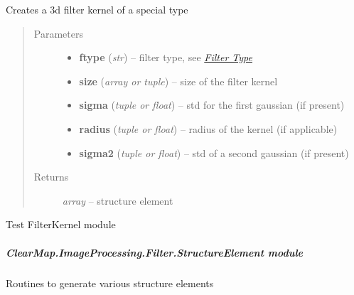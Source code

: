 \documentclass[letterpaper,10pt,english]{sphinxmanual}
\begin{document}
\begin{fulllineitems}
\label{api/ClearMap.ImageProcessing.Filter:ClearMap.ImageProcessing.Filter.FilterKernel.filterKernel3D}
Creates a 3d filter kernel of a special type
\begin{quote}\begin{description}
\item[{Parameters}] \leavevmode\begin{itemize}
\item {} 
\textbf{ftype} (\emph{str}) --
filter type, see {\hyperref[api/ClearMap.ImageProcessing.Filter:filtertypes]{\emph{Filter Type}}}

\item {} 
\textbf{size} (\emph{array or tuple}) --
size of the filter kernel

\item {} 
\textbf{sigma} (\emph{tuple or float}) --
std for the first gaussian (if present)

\item {} 
\textbf{radius} (\emph{tuple or float}) --
radius of the kernel (if applicable)

\item {} 
\textbf{sigma2} (\emph{tuple or float}) --
std of a second gaussian (if present)

\end{itemize}

\item[{Returns}] \leavevmode
\emph{array} --
structure element

\end{description}\end{quote}

\end{fulllineitems}


\begin{fulllineitems}
\label{api/ClearMap.ImageProcessing.Filter:ClearMap.ImageProcessing.Filter.FilterKernel.test}
Test FilterKernel module

\end{fulllineitems}



\subparagraph{ClearMap.ImageProcessing.Filter.StructureElement module}
\label{api/ClearMap.ImageProcessing.Filter:clearmap-imageprocessing-filter-structureelement-module}\label{api/ClearMap.ImageProcessing.Filter:module-ClearMap.ImageProcessing.Filter.StructureElement}
Routines to generate various structure elements
\end{document}
